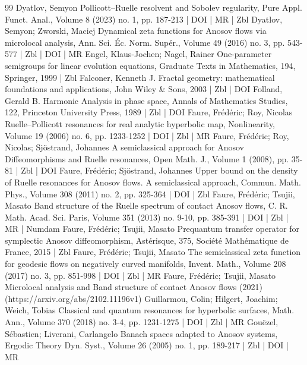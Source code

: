 \begin{thebibliography}{99}
Dyatlov, Semyon Pollicott–Ruelle resolvent and Sobolev regularity, Pure Appl. Funct. Anal., Volume 8 (2023) no. 1, pp. 187-213 | DOI | MR | Zbl
Dyatlov, Semyon; Zworski, Maciej Dynamical zeta functions for Anosov flows via microlocal analysis, Ann. Sci. Éc. Norm. Supér., Volume 49 (2016) no. 3, pp. 543-577 | Zbl | DOI | MR
Engel, Klaus-Jochen; Nagel, Rainer One-parameter semigroups for linear evolution equations, Graduate Texts in Mathematics, 194, Springer, 1999 | Zbl
Falconer, Kenneth J. Fractal geometry: mathematical foundations and applications, John Wiley \& Sons, 2003 | Zbl | DOI
Folland, Gerald B. Harmonic Analysis in phase space, Annals of Mathematics Studies, 122, Princeton University Press, 1989 | Zbl | DOI
Faure, Frédéric; Roy, Nicolas Ruelle–Pollicott resonances for real analytic hyperbolic map, Nonlinearity, Volume 19 (2006) no. 6, pp. 1233-1252 | DOI | Zbl | MR
Faure, Frédéric; Roy, Nicolas; Sjöstrand, Johannes A semiclassical approach for Anosov Diffeomorphisms and Ruelle resonances, Open Math. J., Volume 1 (2008), pp. 35-81 | Zbl | DOI
Faure, Frédéric; Sjöstrand, Johannes Upper bound on the density of Ruelle resonances for Anosov flows. A semiclassical approach, Commun. Math. Phys., Volume 308 (2011) no. 2, pp. 325-364 | DOI | Zbl
Faure, Frédéric; Tsujii, Masato Band structure of the Ruelle spectrum of contact Anosov flows, C. R. Math. Acad. Sci. Paris, Volume 351 (2013) no. 9-10, pp. 385-391 | DOI | Zbl | MR | Numdam
Faure, Frédéric; Tsujii, Masato Prequantum transfer operator for symplectic Anosov diffeomorphism, Astérisque, 375, Société Mathématique de France, 2015 | Zbl
Faure, Frédéric; Tsujii, Masato The semiclassical zeta function for geodesic flows on negatively curved manifolds, Invent. Math., Volume 208 (2017) no. 3, pp. 851-998 | DOI | Zbl | MR
Faure, Frédéric; Tsujii, Masato Microlocal analysis and Band structure of contact Anosov flows (2021) (https://arxiv.org/abs/2102.11196v1)
Guillarmou, Colin; Hilgert, Joachim; Weich, Tobias Classical and quantum resonances for hyperbolic surfaces, Math. Ann., Volume 370 (2018) no. 3-4, pp. 1231-1275 | DOI | Zbl | MR
Gouëzel, Sébastien; Liverani, Carlangelo Banach spaces adapted to Anosov systems, Ergodic Theory Dyn. Syst., Volume 26 (2005) no. 1, pp. 189-217 | Zbl | DOI | MR

\end{thebibliography}

